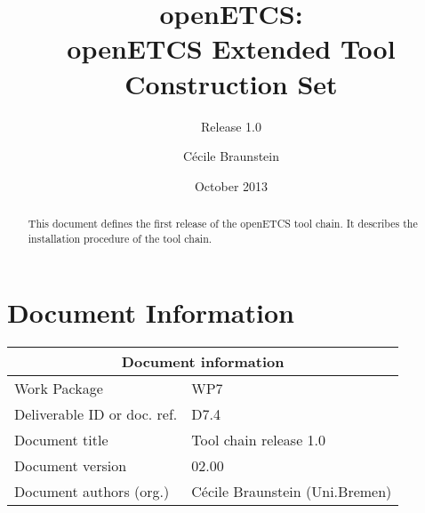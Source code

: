 \documentclass{template/openetcs_report}
\begin{document}
\frontmatter
{}




\title{openETCS:\\ openETCS Extended Tool Construction Set }

\subtitle{Release 1.0}

\date{October 2013}







\author{C\'ecile Braunstein}



\begin{abstract}
This document defines the first release of the openETCS tool chain. It
describes the installation procedure of the tool chain.
\end{abstract}

\maketitle
\tableofcontents

\newpage

\chapter{Document Information}
\begin{tabular}{|p{4.4cm}|p{8.7cm}|}
\hline
\multicolumn{2}{|c|}{Document information} \\
\hline
Work Package &  WP7  \\
Deliverable ID or doc. ref. & D7.4\\
\hline
Document title & Tool chain release 1.0 \\
Document version & 02.00 \\
Document authors (org.)  & Cécile Braunstein  (Uni.Bremen)  \\
\hline
\end{tabular}
\end{document}
